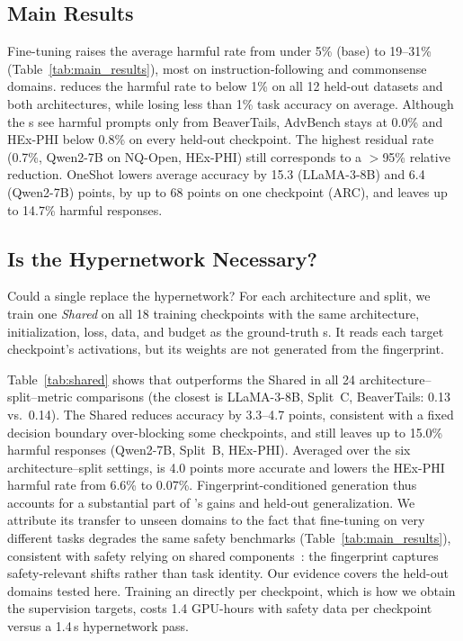 \subsection{Main Results}



Fine-tuning raises the average harmful rate from under 5\% (base) to 19--31\% (Table~\ref{tab:main_results}), most on instruction-following and commonsense domains. \method{} reduces the harmful rate to below 1\% on all 12 held-out datasets and both architectures, while losing less than 1\% task accuracy on average. Although the \ssn{}s see harmful prompts only from BeaverTails, AdvBench stays at 0.0\% and HEx-PHI below 0.8\% on every held-out checkpoint. The highest residual rate (0.7\%, Qwen2-7B on NQ-Open, HEx-PHI) still corresponds to a $>$95\% relative reduction. OneShot lowers average accuracy by 15.3 (LLaMA-3-8B) and 6.4 (Qwen2-7B) points, by up to 68 points on one checkpoint (ARC), and leaves up to 14.7\% harmful responses.

\subsection{Is the Hypernetwork Necessary?}
\label{sec:shared}

Could a single \ssn{} replace the hypernetwork? For each architecture and split, we train one \emph{Shared \ssn{}} on all 18 training checkpoints with the same architecture, initialization, loss, data, and budget as the ground-truth \ssn{}s. It reads each target checkpoint's activations, but its weights are not generated from the fingerprint.



Table~\ref{tab:shared} shows that \method{} outperforms the Shared \ssn{} in all 24 architecture--split--metric comparisons (the closest is LLaMA-3-8B, Split~C, BeaverTails: 0.13 vs.\ 0.14). The Shared \ssn{} reduces accuracy by 3.3--4.7 points, consistent with a fixed decision boundary over-blocking some checkpoints, and still leaves up to 15.0\% harmful responses (Qwen2-7B, Split~B, HEx-PHI). Averaged over the six architecture--split settings, \method{} is 4.0 points more accurate and lowers the HEx-PHI harmful rate from 6.6\% to 0.07\%. Fingerprint-conditioned generation thus accounts for a substantial part of \method{}'s gains and held-out generalization. We attribute its transfer to unseen domains to the fact that fine-tuning on very different tasks degrades the same safety benchmarks (Table~\ref{tab:main_results}), consistent with safety relying on shared components~\citep{qi2024finetuning,wei2024assessing}: the fingerprint captures safety-relevant shifts rather than task identity. Our evidence covers the held-out domains tested here. Training an \ssn{} directly per checkpoint, which is how we obtain the supervision targets, costs 1.4 GPU-hours with safety data per checkpoint versus a 1.4\,s hypernetwork pass.

